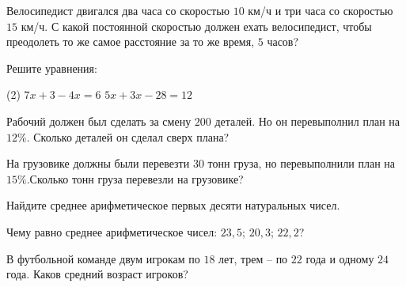 \begin{homework}[number=1]
	\begin{listofex}
		\item Велосипедист двигался два часа со скоростью \( 10 \) км/ч  и три часа со скоростью \( 15 \) км/ч. С какой постоянной скоростью должен  ехать велосипедист, чтобы преодолеть то же самое расстояние за то же время, \( 5 \) часов?    
		\item Решите уравнения:
		\begin{tasks}(2)
			\task \( 7x +3 - 4x = 6 \)
			\task \( 5x +3x - 28 = 12 \)
		\end{tasks}
		\item Рабочий должен был сделать за смену \( 200 \) деталей. Но он перевыполнил план на \( 12\% \). Сколько деталей он сделал сверх плана?
		\item На грузовике должны были перевезти \( 30 \) тонн груза, но перевыполнили план на \( 15\% \).Сколько тонн груза перевезли на грузовике?
		\item Найдите среднее арифметическое первых десяти натуральных чисел.
		\item Чему равно среднее арифметическое чисел: \( 23,5 \); \( 20,3 \); \( 22,2 \)?
		\item В футбольной команде двум игрокам по \( 18 \) лет, трем – по \( 22 \) года и одному \( 24 \) года. Каков средний возраст игроков?
	\end{listofex}
\end{homework}

